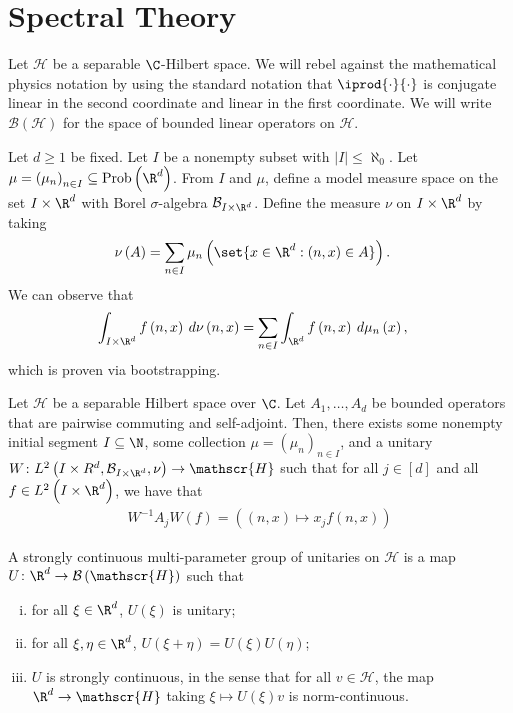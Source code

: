 \documentclass[10pt]{mypackage}
\begin{document}
\section{Spectral Theory}%
Let $\mathscr{H}$ be a separable $\C$-Hilbert space. We will rebel against the mathematical physics notation by using the standard notation that $ \iprod{\cdot}{\cdot} $ is conjugate linear in the second coordinate and linear in the first coordinate. We will write $\mathcal{B}\left(\mathscr{H}\right)$ for the space of bounded linear operators on $\mathscr{H}$.

Let $d\geq 1$ be fixed. Let $I$ be a nonempty subset with $\left\vert I \right\vert\leq \aleph_0$. Let $\mu = \left( \mu_n \right)_{n\in I}\subseteq \operatorname{Prob}\left( \R^d \right)$. From $I$ and $\mu$, define a model measure space on the set $I\times \R^d$ with Borel $\sigma$-algebra $\mathcal{B}_{I\times \R^d}$. Define the measure $\nu$ on $I\times \R^d$ by taking
\begin{align*}
  \nu\left( A \right) &= \sum_{n\in I} \mu_n\left( \set{x\in \R^d : \left( n,x \right)\in A} \right).
\end{align*}
We can observe that
\begin{align*}
  \int_{I\times \R^d}^{} f\left( n,x \right)\:d\nu\left( n,x \right) &= \sum_{n\in I} \int_{\R^d}^{} f\left( n,x \right)\:d\mu_n\left( x \right),
\end{align*}
which is proven via bootstrapping.
\begin{theorem}
  Let $\mathscr{H}$ be a separable Hilbert space over $\C$. Let $A_1,\dots,A_d$ be bounded operators that are pairwise commuting and self-adjoint. Then, there exists some nonempty initial segment $I\subseteq \N$, some collection $\mu = \left( \mu_n \right)_{n\in I}$, and a unitary $W\colon L^2\left( I\times R^d,\mathcal{B}_{I\times \R^d},\nu \right)\to \mathscr{H}$ such that for all $j\in [d]$ and all $f\in L^2\left( I\times \R^d \right)$, we have that 
  \begin{align*}
    W^{-1}A_jW(f) = \left( \left( n,x \right) \mapsto x_jf\left( n,x \right) \right)
  \end{align*}
\end{theorem}
\begin{definition}
  A strongly continuous multi-parameter group of unitaries on $\mathscr{H}$ is a map $U\colon \R^d\to \mathcal{B}\left( \mathscr{H} \right)$ such that
  \begin{enumerate}[(i)]
    \item for all $\xi\in \R^d$, $U(\xi)$ is unitary;
    \item for all $\xi,\eta\in \R^d$, $U\left( \xi + \eta \right) = U(\xi)U(\eta)$;
    \item $U$ is strongly continuous, in the sense that for all $v\in \mathscr{H}$, the map $\R^d\to \mathscr{H}$ taking $\xi\mapsto U(\xi)v$ is norm-continuous.
  \end{enumerate}
\end{definition}
\end{document}
